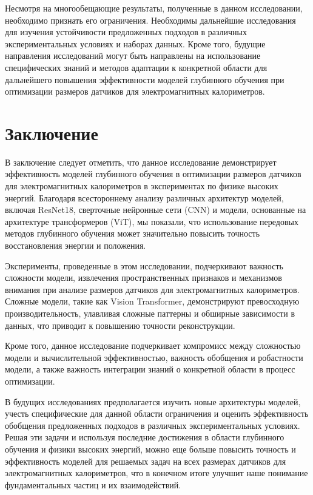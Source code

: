 \documentclass[a4paper,12pt]{extarticle}
\begin{document}
Несмотря на многообещающие результаты, полученные в данном исследовании, необходимо признать его ограничения. Необходимы дальнейшие исследования для изучения устойчивости предложенных подходов в различных экспериментальных условиях и наборах данных. Кроме того, будущие направления исследований могут быть направлены на использование специфических знаний и методов адаптации к конкретной области для дальнейшего повышения эффективности моделей глубинного обучения при оптимизации размеров датчиков для электромагнитных калориметров.

\section{Заключение}
\label{section:conclusion}

В заключение следует отметить, что данное исследование демонстрирует эффективность моделей глубинного обучения в оптимизации размеров датчиков для электромагнитных калориметров в экспериментах по физике высоких энергий. Благодаря всестороннему анализу различных архитектур моделей, включая \textsf{ResNet18}, сверточные нейронные сети (\textsf{CNN}) и модели, основанные на архитектуре трансформеров (\textsf{ViT}), мы показали, что использование передовых методов глубинного обучения может значительно повысить точность восстановления энергии и положения.

Эксперименты, проведенные в этом исследовании, подчеркивают важность сложности модели, извлечения пространственных признаков и механизмов внимания при анализе размеров датчиков для электромагнитных калориметров. Сложные модели, такие как Vision Transformer, демонстрируют превосходную производительность, улавливая сложные паттерны и обширные зависимости в данных, что приводит к повышению точности реконструкции.

Кроме того, данное исследование подчеркивает компромисс между сложностью модели и вычислительной эффективностью, важность обобщения и робастности модели, а также важность интеграции знаний о конкретной области в процесс оптимизации.

В будущих исследованиях предполагается изучить новые архитектуры моделей, учесть специфические для данной области ограничения и оценить эффективность обобщения предложенных подходов в различных экспериментальных условиях. Решая эти задачи и используя последние достижения в области глубинного обучения и физики высоких энергий, можно еще больше повысить точность и эффективность моделей для решаемых задач на всех размерах датчиков для электромагнитных калориметров, что в конечном итоге улучшит наше понимание фундаментальных частиц и их взаимодействий.
\end{document}

